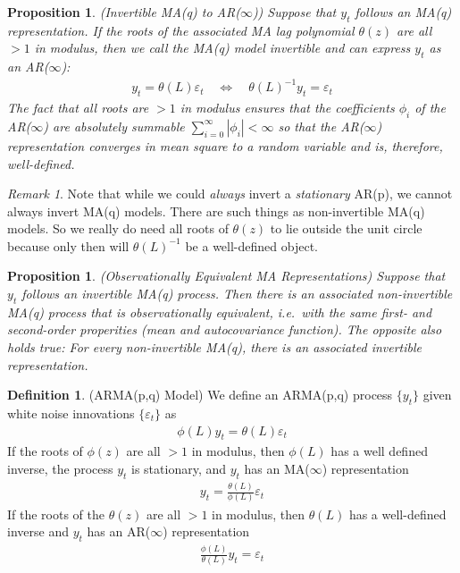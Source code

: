 \documentclass[12pt]{article}
\theoremstyle{plain}
\newtheorem{prop}[thm]{Proposition}
\theoremstyle{definition}
\newtheorem{defn}[thm]{Definition}
\theoremstyle{remark}
\newtheorem*{rmk}{Remark}
\begin{document}
\begin{prop}\emph{(Invertible MA(q) to AR($\infty$))}
\label{prop:matoar}
Suppose that $y_t$ follows an MA(q) representation.  If the roots of the
associated MA lag polynomial $\theta(z)$ are all $>1$ in modulus, then
we call the MA(q) model \emph{invertible} and can express $y_t$ as an
AR($\infty$):
\begin{align*}
  y_t = \theta(L)\varepsilon_t
  \quad\iff\quad
  \theta(L)^{-1}y_t = \varepsilon_t
\end{align*}
The fact that all roots are $>1$ in modulus ensures that the
coefficients $\phi_i$ of the AR($\infty$) are absolutely summable
$\sum_{i=0}^\infty |\phi_i|<\infty$ so that the AR($\infty$)
representation converges in mean square to a random variable and is,
therefore, well-defined.
\end{prop}

\begin{rmk}
Note that while we could \emph{always} invert a \emph{stationary} AR(p),
we cannot always invert MA(q) models. There are such things as
non-invertible MA(q) models. So we really do need all roots of
$\theta(z)$ to lie outside the unit circle because only then will
$\theta(L)^{-1}$ be a well-defined object.
\end{rmk}

\begin{prop}\emph{(Observationally Equivalent MA Representations)}
Suppose that $y_t$ follows an invertible MA(q) process. Then there is an
associated non-invertible MA(q) process that is
\emph{observationally equivalent}, i.e.\ with the same first- and
second-order properities (mean and autocovariance function). The
opposite also holds true: For every non-invertible MA(q), there is an
associated invertible representation.
\end{prop}

\begin{defn}(ARMA(p,q) Model)
We define an ARMA(p,q) process $\{y_t\}$ given white noise innovations
$\{\varepsilon_t\}$ as
\begin{align*}
  \phi(L)y_t = \theta(L)\varepsilon_t
\end{align*}
If the roots of $\phi(z)$ are all $>1$ in modulus, then $\phi(L)$ has a
well defined inverse, the process $y_t$ is stationary, and $y_t$ has an
MA($\infty$) representation
\begin{align*}
  y_t = \frac{\theta(L)}{\phi(L)}\varepsilon_t
\end{align*}
If the roots of the $\theta(z)$ are all $>1$ in modulus, then
$\theta(L)$ has a well-defined inverse and $y_t$ has an AR($\infty$)
representation
\begin{align*}
  \frac{\phi(L)}{\theta(L)}y_t = \varepsilon_t
\end{align*}
\end{defn}
\end{document}
